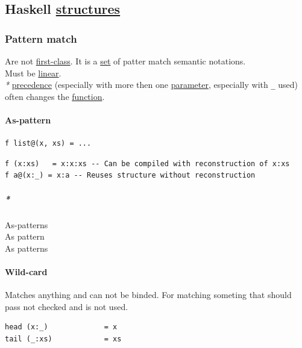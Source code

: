 \documentclass[11pt]{article}
\begin{document}
\subsection{Haskell \hyperref[org51d1eff]{structures}}
\label{sec:org45a74a5}
\subsubsection{\label{org6cd4afa}Pattern match}
\label{sec:org5f5e952}
Are not \hyperref[org6b0d252]{first-class}. It is a \hyperref[orgbed80ba]{set} of patter match semantic notations.\\

Must be \hyperref[orgb55e183]{linear}.\\

\emph{*} \hyperref[orgd18f0db]{precedence} (especially with more then one \hyperref[org45d4a16]{parameter}, especially with \texttt{\_} used) often changes the \hyperref[orgeb5cddb]{function}.\\

\paragraph{\label{orge361b9d}As-pattern}
\label{sec:orge64259d}
\begin{verbatim}
f list@(x, xs) = ...
\end{verbatim}

\begin{verbatim}
f (x:xs)   = x:x:xs -- Can be compiled with reconstruction of x:xs
f a@(x:_) = x:a -- Reuses structure without reconstruction
\end{verbatim}

\subparagraph{\emph{*}}
\label{sec:orgd9daa80}

\label{orgdd97634}As-patterns\\
\label{org1589f48}As pattern\\
\label{org3eaf233}As patterns\\

\paragraph{\label{orgcc14690}Wild-card}
\label{sec:orga46438b}
Matches anything and can not be binded. For matching someting that should pass not checked and is not used.\\

\begin{verbatim}
head (x:_)             = x
tail (_:xs)            = xs
\end{verbatim}
\end{document}
